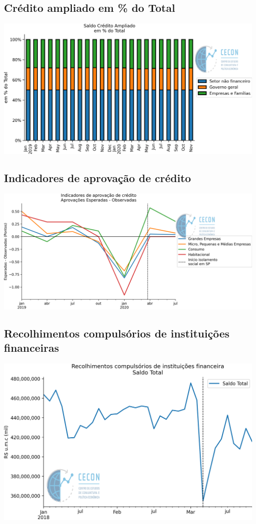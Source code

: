 \documentclass{SelfArx}
\begin{document}
\subsection*{Crédito ampliado em \% do Total}
\label{sec:org2052d6f}

\begin{center}
\includegraphics[width=.9\linewidth]{./figs/Credito/SaldoCreditoAmpliado_Total.png}
\end{center}

\subsection*{Indicadores de aprovação de crédito}
\label{sec:org356e7a6}

\begin{center}
\includegraphics[width=.9\linewidth]{./figs/Credito/PTC.png}
\end{center}

\subsection*{Recolhimentos compulsórios de instituições financeiras}
\label{sec:org6f2e4d3}

\begin{center}
\includegraphics[width=.9\linewidth]{./figs/Credito/Recolhimentos_Total.png}
\end{center}
\end{document}
